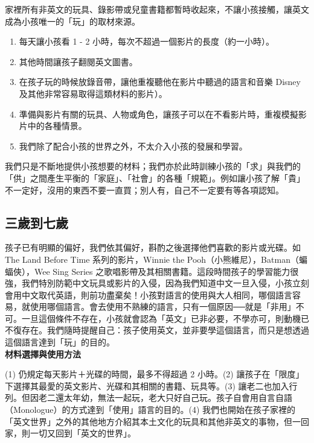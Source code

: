 家裡所有非英文的玩具、錄影帶或兒童書籍都暫時收起來，不讓小孩接觸，讓英文成為小孩唯一的「玩」的取材來源。
\begin{enumerate}
\item 每天讓小孩看 1 - 2 小時，每次不超過一個影片的長度（約一小時）。
\item 其他時間讓孩子翻閱英文圖書。
\item 在孩子玩的時候放錄音帶，讓他重複聽他在影片中聽過的語言和音樂 Disney 及其他非常容易取得這類材料的影片）。
\item 準備與影片有關的玩具、人物或角色，讓孩子可以在不看影片時，重複模擬影片中的各種情景。
\item 我們除了配合小孩的世界之外，不太介入小孩的發展和學習。
\end{enumerate}
我們只是不斷地提供小孩想要的材料；我們亦於此時訓練小孩的「求」與我們的「供」之間產生平衡的「家庭」、「社會」的各種「規範」。例如讓小孩了解「貴」不一定好，沒用的東西不要一直買；別人有，自己不一定要有等各項認知。

\subsection{三歲到七歲}
孩子已有明顯的偏好，我們依其偏好，斟酌之後選擇他們喜歡的影片或光碟。如 The Land Before Time 系列的影片，Winnie the Pooh（小熊維尼），Batman（蝙蝠俠），Wee Sing Series 之歌唱影帶及其相關書籍。這段時間孩子的學習能力很強，我們特別防範中文玩具或影片的入侵，因為我們知道中文一旦入侵，小孩立刻會用中文取代英語，則前功盡棄矣！小孩對語言的使用與大人相同，哪個語言容易，就使用哪個語言。會去使用不熟練的語言，只有一個原因──就是「非用」不可。一旦這個條件不存在，小孩就會認為「英文」已非必要，不學亦可，則動機已不復存在。我們隨時提醒自己：孩子使用英文，並非要學這個語言，而只是想透過這個語言達到「玩」的目的。\\

\textbf{材料選擇與使用方法}

(1) 仍規定每天影片＋光碟的時間，最多不得超過 2 小時。(2) 讓孩子在「限度」下選擇其最愛的英文影片、光碟和其相關的書籍、玩具等。(3) 讓老二也加入行列。但因老二還太年幼，無法一起玩，老大只好自己玩。孩子自會用自言自語（Monologue）的方式達到「使用」語言的目的。(4) 我們也開始在孩子家裡的「英文世界」之外的其他地方介紹其本土文化的玩具和其他非英文的事物，但一回家，則一切又回到「英文的世界」。

